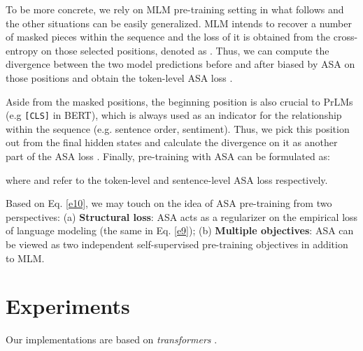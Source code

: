 \documentclass[letterpaper]{article} \usepackage{aaai23}  \usepackage{times}  \usepackage{helvet}  \usepackage{courier}  \usepackage[hyphens]{url}  \usepackage{graphicx} \urlstyle{rm} \def\UrlFont{\rm}  \usepackage{natbib}  \usepackage{caption} \frenchspacing  \setlength{\pdfpagewidth}{8.5in}  \setlength{\pdfpageheight}{11in}  \usepackage{algorithm}
\begin{document}
To be more concrete, we rely on MLM pre-training setting \citep{DBLP:conf/naacl/DevlinCLT19} in what follows and the other situations can be easily generalized. MLM intends to recover a number of masked pieces within the sequence and the loss of it is obtained from the cross-entropy on those selected positions, denoted as . Thus, we can compute the divergence between the two model predictions before and after biased by ASA on those positions and obtain the token-level ASA loss .

Aside from the masked positions, the beginning position is also crucial to PrLMs (e.g \texttt{[CLS]} in BERT), which is always used as an indicator for the relationship within the sequence (e.g. sentence order, sentiment). Thus, we pick this position out from the final hidden states and calculate the divergence on it as another part of the ASA loss . Finally, pre-training with ASA can be formulated as:

where  and  refer to the token-level and sentence-level ASA loss respectively.

Based on Eq. \ref{e10}, we may touch on the idea of ASA pre-training from two perspectives: (a) \textbf{Structural loss}: ASA acts as a regularizer on the empirical loss of language modeling (the same in Eq. \ref{e9}); (b) \textbf{Multiple objectives}: ASA can be viewed as two independent self-supervised pre-training objectives in addition to MLM.


\section{Experiments}
\label{s4}

Our implementations are based on \emph{transformers} \citep{wolf-etal-2020-transformers}.
\end{document}
